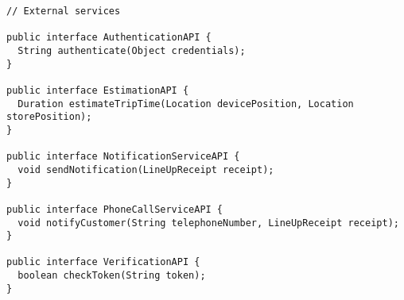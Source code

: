 \documentclass[../../main.tex]{subfiles}
\begin{document}
\begin{lstlisting}
// External services

public interface AuthenticationAPI {
  String authenticate(Object credentials);
}

public interface EstimationAPI {
  Duration estimateTripTime(Location devicePosition, Location storePosition);
}

public interface NotificationServiceAPI {
  void sendNotification(LineUpReceipt receipt);
}

public interface PhoneCallServiceAPI {
  void notifyCustomer(String telephoneNumber, LineUpReceipt receipt);
}

public interface VerificationAPI {
  boolean checkToken(String token);
}
\end{lstlisting}
\end{document}
